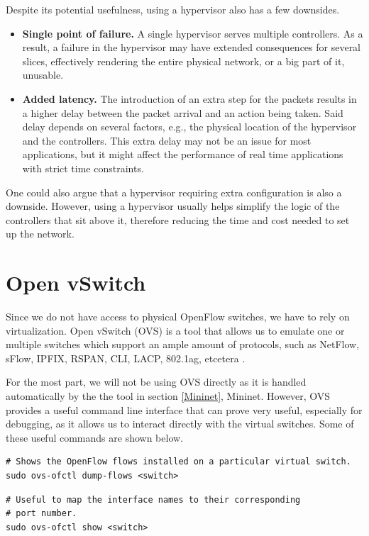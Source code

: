 Despite its potential usefulness, using a hypervisor also has a few downsides.
\begin{itemize}
    \item \textbf{Single point of failure.} A single hypervisor serves multiple controllers. As a result, a failure in the hypervisor may have extended consequences for several slices, effectively rendering the entire physical network, or a big part of it, unusable.
    
    \item \textbf{Added latency.} The introduction of an extra step for the packets results in a higher delay between the packet arrival and an action being taken. Said delay depends on several factors, e.g., the physical location of the hypervisor and the controllers. This extra delay may not be an issue for most applications, but it might affect the performance of real time applications with strict time constraints.
\end{itemize}

One could also argue that a hypervisor requiring extra configuration is also a downside. However, using a hypervisor usually helps simplify the logic of the controllers that sit above it, therefore reducing the time and cost needed to set up the network.

\section{Open vSwitch} \label{section_ovswitch}
Since we do not have access to physical OpenFlow switches, we have to rely on virtualization. Open vSwitch\cite{ovs_website} (OVS) is a tool that allows us to emulate one or multiple switches which support an ample amount of protocols, such as NetFlow, sFlow, IPFIX, RSPAN, CLI, LACP, 802.1ag, etcetera \cite{ovswitch}.

For the most part, we will not be using OVS directly as it is handled automatically by the the tool in section \ref{Mininet}, Mininet. However, OVS provides a useful command line interface that can prove very useful, especially for debugging, as it allows us to interact directly with the virtual switches. Some of these useful commands are shown below.

\begin{lstlisting}
# Shows the OpenFlow flows installed on a particular virtual switch.
sudo ovs-ofctl dump-flows <switch>
\end{lstlisting}

\begin{lstlisting}
# Useful to map the interface names to their corresponding 
# port number.
sudo ovs-ofctl show <switch>
\end{lstlisting}

